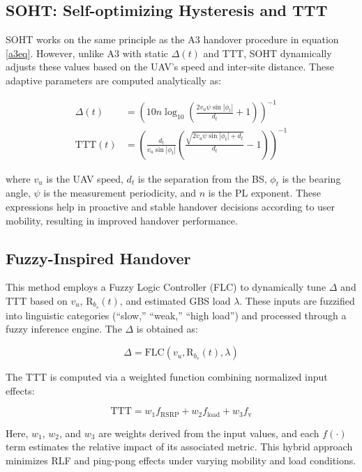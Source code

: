 \documentclass[conference]{IEEEtran}
\begin{document}
\subsection{SOHT: Self-optimizing Hysteresis and TTT}
SOHT works on the same principle as the A3 handover procedure in equation \eqref{a3eq}. However, unlike A3 with static $\Delta(t)$ and TTT, SOHT dynamically adjusts these values based on the UAV's speed and inter-site distance. These adaptive parameters are computed analytically as:

\begin{align}
\Delta(t) &= \left(10n \log_{10}\left(\frac{2v_u \psi \sin |\phi_t|}{d_t} + 1\right)\right)^{-1} \\
\mathrm{TTT}(t) &= \left(\frac{d_t}{v_u \sin |\phi_t|} \left(\frac{\sqrt{2v_u \psi \sin |\phi_t| + d_t}}{d_t} - 1\right)\right)^{-1}
\end{align}

where $v_u$ is the UAV speed, $d_t$ is the separation from the BS, $\phi_t$ is the bearing angle, $\psi$ is the measurement periodicity, and $n$ is the PL exponent. These expressions help in proactive and stable handover decisions according to user mobility, resulting in improved handover performance. 


\subsection{Fuzzy-Inspired Handover}
This method employs a Fuzzy Logic Controller (FLC) to dynamically tune $\Delta$ and TTT based on $v_u$, $\mathrm{R}_{b_s}(t)$, and estimated GBS load $\lambda$. These inputs are fuzzified into linguistic categories (``slow,'' ``weak,'' ``high load'') and processed through a fuzzy inference engine. The $\Delta$ is obtained as:

\begin{equation}
\Delta = \mathrm{FLC}(v_u, \mathrm{R}_{b_s}(t), \lambda)
\end{equation}

The TTT is computed via a weighted function combining normalized input effects:

\begin{equation}
\mathrm{TTT} = w_1 f_{\mathrm{RSRP}} + w_2 f_{\mathrm{load}} + w_3 f_{\mathrm{v}}
\end{equation}

Here, $w_1$, $w_2$, and $w_3$ are weights derived from the input values, and each $f(\cdot)$ term estimates the relative impact of its associated metric. This hybrid approach minimizes RLF and ping-pong effects under varying mobility and load conditions.
\end{document}

